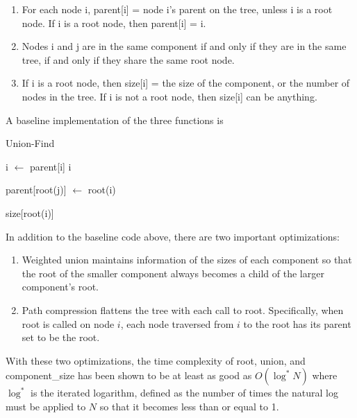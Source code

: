 \begin{enumerate}[1.]
\item
For each node i, parent[i] = node i's parent on the tree, unless i is a
root node. If i is a root node, then parent[i] = i.

\item
Nodes i and j are in the same component if and only if they are in the
same tree, if and only if they share the same root node.

\item
If i is a root node, then size[i] = the size of the component, or the
number of nodes in the tree. If i is not a root node, then size[i] can
be anything.
\end{enumerate}

A baseline implementation of the three functions is

\begin{algorithm}
\caption{Union-Find}
\begin{algorithmic}

        \State i $\gets$ parent[i]
    \EndWhile
    \State \Return i
\EndFunction
\State 

    \State parent[root(j)] $\gets$ root(i)
\EndFunction
\State 

    \State \Return size[root(i)]
\EndFunction

\end{algorithmic}
\end{algorithm}

In addition to the baseline code above, there are two important
optimizations:

\begin{enumerate}[1.]
\item
Weighted union maintains information of the sizes of each component so
that the root of the smaller component always becomes a child of the
larger component's root.

\item
Path compression flattens the tree with each call to root. Specifically,
when root is called on node $i$, each node traversed from $i$ to the
root has its parent set to be the root.
\end{enumerate}

With these two optimizations, the time complexity of root, union, and
component\_size has been shown to be at least as good as $O(\log^* N)$
where $\log^*$ is the iterated logarithm, defined as the number of
times the natural log must be applied to $N$ so that it becomes less
than or equal to 1.

